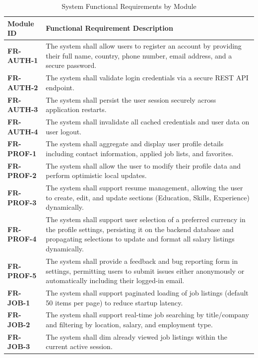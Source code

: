 \begin{table}[htbp]
\centering
\caption{System Functional Requirements by Module}
\label{tab:functional_requirements}
\begin{tabular}{|l|p{10cm}|}
\hline
\textbf{Module ID} & \textbf{Functional Requirement Description} \\ \hline
\textbf{FR-AUTH-1} & The system shall allow users to register an account by providing their full name, country, phone number, email address, and a secure password. \\ \hline
\textbf{FR-AUTH-2} & The system shall validate login credentials via a secure REST API endpoint. \\ \hline
\textbf{FR-AUTH-3} & The system shall persist the user session securely across application restarts. \\ \hline
\textbf{FR-AUTH-4} & The system shall invalidate all cached credentials and user data on user logout. \\ \hline
\textbf{FR-PROF-1} & The system shall aggregate and display user profile details including contact information, applied job lists, and favorites. \\ \hline
\textbf{FR-PROF-2} & The system shall allow the user to modify their profile data and perform optimistic local updates. \\ \hline
\textbf{FR-PROF-3} & The system shall support resume management, allowing the user to create, edit, and update sections (Education, Skills, Experience) dynamically. \\ \hline
\textbf{FR-PROF-4} & The system shall support user selection of a preferred currency in the profile settings, persisting it on the backend database and propagating selections to update and format all salary listings dynamically. \\ \hline
\textbf{FR-PROF-5} & The system shall provide a feedback and bug reporting form in settings, permitting users to submit issues either anonymously or automatically including their logged-in email. \\ \hline
\textbf{FR-JOB-1}  & The system shall support paginated loading of job listings (default 50 items per page) to reduce startup latency. \\ \hline
\textbf{FR-JOB-2}  & The system shall support real-time job searching by title/company and filtering by location, salary, and employment type. \\ \hline
\textbf{FR-JOB-3}  & The system shall dim already viewed job listings within the current active session. \\ \hline

\end{tabular}
\end{table}
